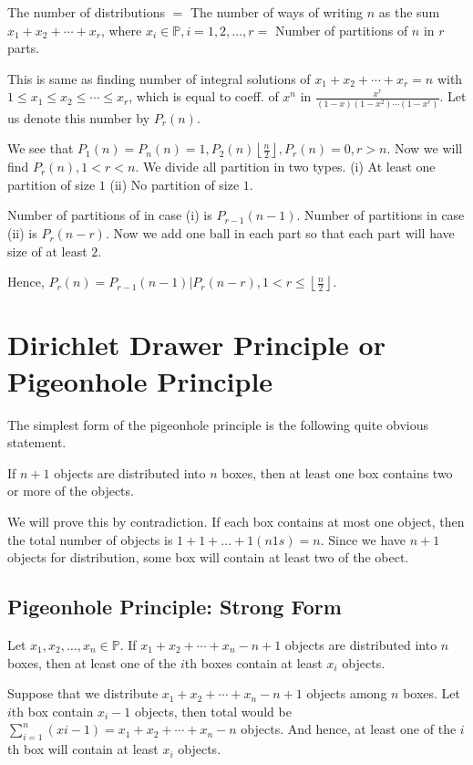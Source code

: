 The number of distributions $=$ The number of ways of writing $n$ as the sum $x_1 + x_2 + \cdots + x_r$,
where $x_i\in\mathbb{P}, i = 1, 2, \ldots, r =$ Number of partitions of $n$ in $r$ parts.

This is same as finding number of integral solutions of $x_1 + x_2 + \cdots + x_r = n$ with $1\leq x_1\leq
x_2\leq \cdots \leq x_r$, which is equal to coeff. of $x^n$ in $\frac{x^r}{(1 - x)(1 - x^2)\cdots(1 -
  x^r)}$. Let us denote this number by $P_r(n)$.

We see that $P_1(n) = P_n(n) = 1, P_2(n) \left\lfloor \frac{n}{2}\right\rfloor, P_r(n) = 0, r > n$. Now we
will find $P_r(n), 1< r < n$. We divide all partition in two types. (i) At least one partition of size $1$
(ii) No partition of size $1$.

Number of partitions of in case (i) is $P_{r - 1}(n - 1)$. Number of partitions in case (ii) is $P_r(n -
r)$. Now we add one ball in each part so that each part will have size of at least $2$.

Hence, $P_r(n) = P_{r - 1}(n - 1) | P_r(n - r), 1 < r\leq \left\lfloor \frac{n}{2}\right\rfloor$.

\section{Dirichlet Drawer Principle or Pigeonhole Principle}
The simplest form of the pigeonhole principle is the following quite obvious statement.

\starttheorem
  If $n + 1$ objects are distributed into $n$ boxes, then at least one box contains two or more of the objects.
\stoptheorem

\startproof
  We will prove this by contradiction. If each box contains at most one object, then the total number of
  objects is $1 + 1 + \ldots + 1(n 1s) = n$. Since we have $n + 1$ objects for distribution, some box will
  contain at least two of the obect.
\stopproof

\subsection{Pigeonhole Principle: Strong Form}
\starttheorem
  Let $x_1, x_2, \ldots, x_n\in\mathbb{P}$. If $x_1+ x_2 + \cdots + x_n - n + 1$ objects are distributed
  into $n$ boxes, then at least one of the $i$th boxes contain at least $x_i$ objects.
\stoptheorem

\startproof
  Suppose that we distribute $x_1 + x_2 + \cdots + x_n - n + 1$ objects among $n$ boxes. Let $i$th box
  contain $x_i - 1$ objects, then total would be $\displaystyle\sum_{i=1}^n(xi - 1) = x_1 + x_2 + \cdots +
  x_n - n$ objects. And hence, at least one of the $i$th box will contain at least $x_i$ objects.
\stopproof
\pagebreak
